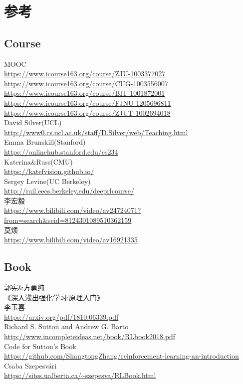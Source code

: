 \documentclass{book}
\begin{document}
\tableofcontents
\chapter{参考}
\section{Course}
\noindent MOOC\\
\url{https://www.icourse163.org/course/ZJU-1003377027}\\
\url{https://www.icourse163.org/course/CUG-1003556007}\\
\url{https://www.icourse163.org/course/BIT-1001872001}\\
\url{https://www.icourse163.org/course/FJNU-1205696811}\\
\url{https://www.icourse163.org/course/ZJUT-1002694018}\\
David Silver(UCL)\\
\url{http://www0.cs.ucl.ac.uk/staff/D.Silver/web/Teaching.html}\\
Emma Brunskill(Stanford)\\
\url{https://onlinehub.stanford.edu/cs234}\\
Katerina\&Russ(CMU)\\
\url{https://katefvision.github.io/}\\
Sergey Levine(UC Berkeley)\\
\url{http://rail.eecs.berkeley.edu/deeprlcourse/}\\
李宏毅\\
\url{https://www.bilibili.com/video/av24724071?from=search&seid=8124301089510362159}\\
莫烦\\
\url{https://www.bilibili.com/video/av16921335}
\section{Book}
\noindent 郭宪\&方勇纯\\
《深入浅出强化学习:原理入门》\\
李玉喜\\
\url{https://arxiv.org/pdf/1810.06339.pdf}\\
Richard S. Sutton and Andrew G. Barto\\
\url{http://www.incompleteideas.net/book/RLbook2018.pdf}\\
Code for Sutton's Book\\
\url{https://github.com/ShangtongZhang/reinforcement-learning-an-introduction}\\
Csaba Szepesvári\\
\url{https://sites.ualberta.ca/~szepesva/RLBook.html}
\end{document}
